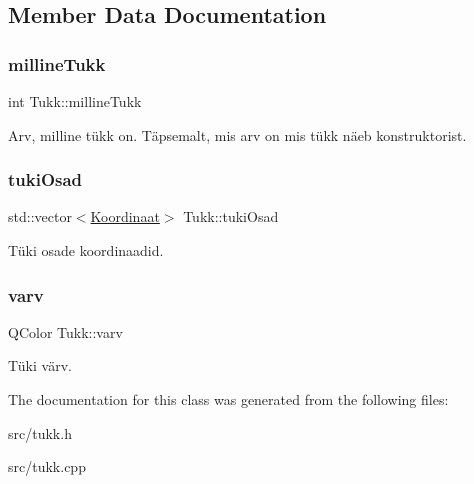 \subsection{Member Data Documentation}
\mbox{\label{class_tukk_a5ac12a5f3cfa2dfea930e0bca00d6051}} 
\subsubsection{\texorpdfstring{millineTukk}{millineTukk}}
{\footnotesize\ttfamily int Tukk\+::milline\+Tukk}

Arv, milline tükk on. Täpsemalt, mis arv on mis tükk näeb konstruktorist. \mbox{\label{class_tukk_a29cc3bf866c68aeaaee2cadcb496b9d3}} 
\subsubsection{\texorpdfstring{tukiOsad}{tukiOsad}}
{\footnotesize\ttfamily std\+::vector$<$\mbox{\hyperlink{struct_koordinaat}{Koordinaat}}$>$ Tukk\+::tuki\+Osad}

Tüki osade koordinaadid. \mbox{\label{class_tukk_a7857976349b7db76f7d7d889404e9728}} 
\subsubsection{\texorpdfstring{varv}{varv}}
{\footnotesize\ttfamily Q\+Color Tukk\+::varv}

Tüki värv. 

The documentation for this class was generated from the following files\+:\begin{DoxyCompactItemize}
\item 
src/tukk.\+h\item 
src/tukk.\+cpp\end{DoxyCompactItemize}
